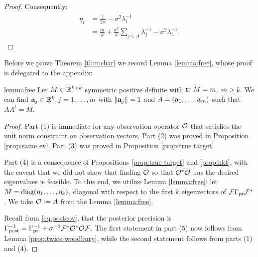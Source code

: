 \begin{proof}
  Consequently:
  \begin{align} \label{eq:etas}
    \begin{split}
      \eta_i &= \frac{1}{2\alpha} - \sigma^2 \lambda_i^{-1}\\
      &=\frac{m}{k} + \frac{\sigma^2}{k} \sum_{j\in A} \lambda_j^{-1} - \sigma^2 \lambda_i^{-1}.%
    \end{split}
  \end{align}
\end{proof}

Before we prove Theorem \ref{thm:char} we record Lemma
\ref{lemma:free}, whose proof is delegated to the appendix:
\begin{restatable*}{lemma}{free}\label{lemma:free}
  Let $M \in \mathbb{R}^{k \times k}$ symmetric positive definite with $\textup{tr}\ M
  = m$, $m \geq k$. We can find $\mathbf{a}_j \in \mathbb{R}^k,j=1,\dots,m$
  with $\|\mathbf{a}_j\|=1$ and $A = (\mathbf{a}_1,\dots,\mathbf{a}_m)$ such that
  $AA^t = M$.
\end{restatable*}

\char*

\begin{proof}
  Part (1) is immediate for any observation operator $\mathcal{O}$ that
  satisfies the unit norm constraint on observation vectors. Part (2)
  was proved in Proposition \ref{prop:same ev}. Part (3) was proved in
  Proposition \ref{prop:true target}.
  
  Part (4) is a consequence of Propositions \ref{prop:true target} and
  \ref{prop:kkt}, with the caveat that we did not show that finding
  $\mathcal{O}$ so that $\mathcal{O}^*\mathcal{O}$ has the desired eigenvalues is
  feasible. To this end, we utilize Lemma \ref{lemma:free}: let $M =
  \textup{diag}(\eta_1, \dots, \eta_k)$, diagonal with respect to the first $k$
  eigenvectors of $\mathcal{F} \Gamma_{\textup{pr}} \mathcal{F}^*$. We take $\mathcal{O} := A$ from the
  Lemma \ref{lemma:free}.
  
  Recall from \eqref{eq:postcov}, that the posterior precision is
  $\Gamma_{\textup{post}}^{-1} = \Gamma_{\textup{pr}}^{-1} + \sigma^{-2}\mathcal{F}^*\mathcal{O}^*\mathcal{O}\mathcal{F}$. The
  first statement in part (5) now follows from Lemma \ref{prop:twice
    woodbury}, while the second statement follows from parts (1) and
  (4).
\end{proof}


